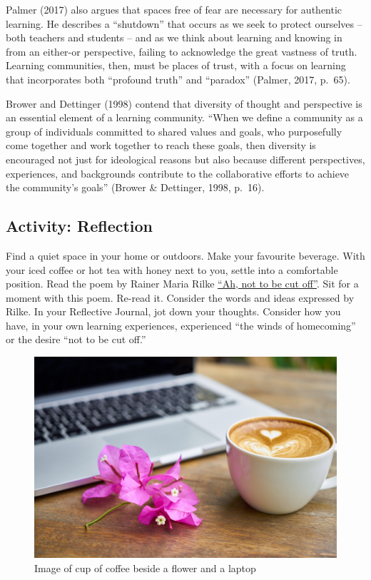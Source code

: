 \documentclass[
]{book}
\begin{document}
Palmer (2017) also argues that spaces free of fear are necessary for authentic learning. He describes a ``shutdown'' that occurs as we seek to protect ourselves -- both teachers and students -- and as we think about learning and knowing in from an either-or perspective, failing to acknowledge the great vastness of truth. Learning communities, then, must be places of trust, with a focus on learning that incorporates both ``profound truth'' and ``paradox'' (Palmer, 2017, p.~65).

Brower and Dettinger (1998) contend that diversity of thought and perspective is an essential element of a learning community. ``When we define a community as a group of individuals committed to shared values and goals, who purposefully come together and work together to reach these goals, then diversity is encouraged not just for ideological reasons but also because different perspectives, experiences, and backgrounds contribute to the collaborative efforts to achieve the community's goals'' (Brower \& Dettinger, 1998, p.~16).

\hypertarget{activity-reflection}{%
\subsection{Activity: Reflection}\label{activity-reflection}}

\begin{reflect}
Find a quiet space in your home or outdoors. Make your favourite
beverage. With your iced coffee or hot tea with honey next to you,
settle into a comfortable position. Read the poem by Rainer Maria Rilke
\href{https://gladdestthing.com/poems/ah-not-to-be-cut-off}{``Ah, not to
be cut off''}. Sit for a moment with this poem. Re-read it. Consider the
words and ideas expressed by Rilke. In your Reflective Journal, jot down
your thoughts. Consider how you have, in your own learning experiences,
experienced ``the winds of homecoming'' or the desire ``not to be cut
off.''
\end{reflect}

\begin{figure}
\centering
\includegraphics{assets/unit3/coffee-2242212_1920.jpg}
\caption{Image of cup of coffee beside a flower and a laptop}
\end{figure}
\end{document}
